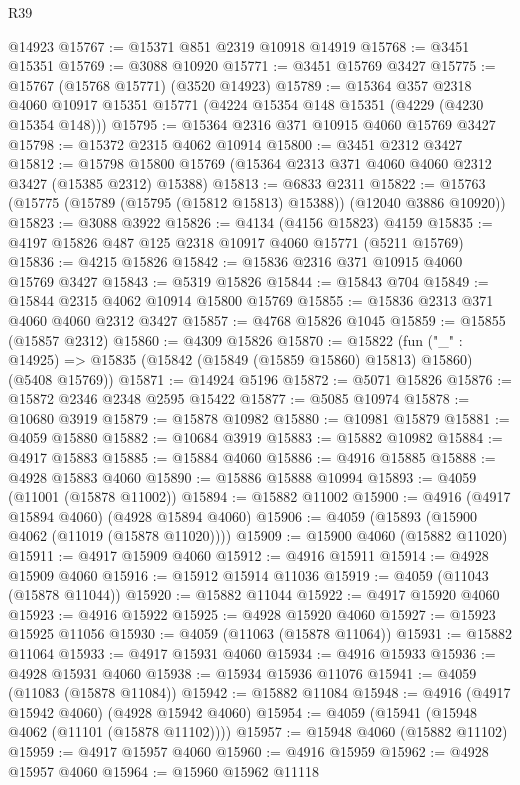 \begin{lexlean}{R39}
\begin{coremodule}
    @14923
@15767 := @15371 @851 @2319 @10918 @14919
@15768 := @3451 @15351
@15769 := @3088 @10920
@15771 := @3451 @15769 @3427
@15775 := @15767 (@15768 @15771) (@3520 @14923)
@15789 := @15364
    @357
    @2318
    @4060
    @10917
    @15351
    @15771
    (@4224 @15354 @148 @15351 (@4229 (@4230 @15354 @148)))
@15795 := @15364 @2316 @371 @10915 @4060 @15769 @3427
@15798 := @15372 @2315 @4062 @10914
@15800 := @3451 @2312 @3427
@15812 := @15798 @15800 @15769 (@15364 @2313 @371 @4060 @4060 @2312 @3427 (@15385 @2312) @15388)
@15813 := @6833 @2311
@15822 := @15763 (@15775 (@15789 (@15795 (@15812 @15813) @15388)) (@12040 @3886 @10920))
@15823 := @3088 @3922
@15826 := @4134 (@4156 @15823) @4159
@15835 := @4197 @15826 @487 @125 @2318 @10917 @4060 @15771 (@5211 @15769)
@15836 := @4215 @15826
@15842 := @15836 @2316 @371 @10915 @4060 @15769 @3427
@15843 := @5319 @15826
@15844 := @15843 @704
@15849 := @15844 @2315 @4062 @10914 @15800 @15769
@15855 := @15836 @2313 @371 @4060 @4060 @2312 @3427
@15857 := @4768 @15826 @1045
@15859 := @15855 (@15857 @2312)
@15860 := @4309 @15826
@15870 := @15822
    (fun ("_" : @14925) => @15835 (@15842 (@15849 (@15859 @15860) @15813) @15860) (@5408 @15769))
@15871 := @14924 @5196
@15872 := @5071 @15826
@15876 := @15872 @2346 @2348 @2595 @15422
@15877 := @5085 @10974
@15878 := @10680 @3919
@15879 := @15878 @10982
@15880 := @10981 @15879
@15881 := @4059 @15880
@15882 := @10684 @3919
@15883 := @15882 @10982
@15884 := @4917 @15883
@15885 := @15884 @4060
@15886 := @4916 @15885
@15888 := @4928 @15883 @4060
@15890 := @15886 @15888 @10994
@15893 := @4059 (@11001 (@15878 @11002))
@15894 := @15882 @11002
@15900 := @4916 (@4917 @15894 @4060) (@4928 @15894 @4060)
@15906 := @4059 (@15893 (@15900 @4062 (@11019 (@15878 @11020))))
@15909 := @15900 @4060 (@15882 @11020)
@15911 := @4917 @15909 @4060
@15912 := @4916 @15911
@15914 := @4928 @15909 @4060
@15916 := @15912 @15914 @11036
@15919 := @4059 (@11043 (@15878 @11044))
@15920 := @15882 @11044
@15922 := @4917 @15920 @4060
@15923 := @4916 @15922
@15925 := @4928 @15920 @4060
@15927 := @15923 @15925 @11056
@15930 := @4059 (@11063 (@15878 @11064))
@15931 := @15882 @11064
@15933 := @4917 @15931 @4060
@15934 := @4916 @15933
@15936 := @4928 @15931 @4060
@15938 := @15934 @15936 @11076
@15941 := @4059 (@11083 (@15878 @11084))
@15942 := @15882 @11084
@15948 := @4916 (@4917 @15942 @4060) (@4928 @15942 @4060)
@15954 := @4059 (@15941 (@15948 @4062 (@11101 (@15878 @11102))))
@15957 := @15948 @4060 (@15882 @11102)
@15959 := @4917 @15957 @4060
@15960 := @4916 @15959
@15962 := @4928 @15957 @4060
@15964 := @15960 @15962 @11118

\end{coremodule}
\end{lexlean}
